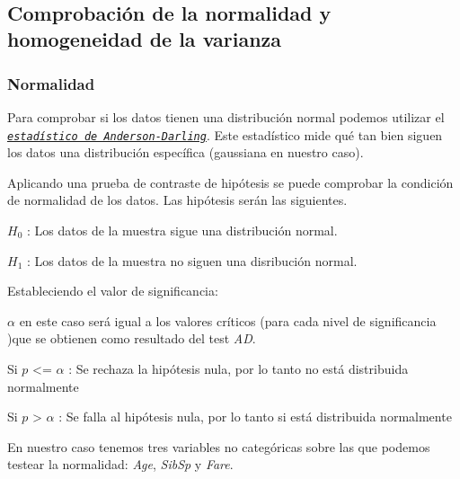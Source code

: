 \documentclass[11pt]{article}
\begin{document}
    \begin{center}
    \end{center}
    { \hspace*{\fill} \\}
    
    \hypertarget{comprobaciuxf3n-de-la-normalidad-y-homogeneidad-de-la-varianza}{%
\subsection{Comprobación de la normalidad y homogeneidad de la
varianza}\label{comprobaciuxf3n-de-la-normalidad-y-homogeneidad-de-la-varianza}}

    \hypertarget{normalidad}{%
\subsubsection{Normalidad}\label{normalidad}}

Para comprobar si los datos tienen una distribución normal podemos
utilizar el
\href{https://support.minitab.com/es-mx/minitab/18/help-and-how-to/statistics/basic-statistics/supporting-topics/normality/the-anderson-darling-statistic/}{\emph{\texttt{estadístico\ de\ Anderson-Darling}}}.
Este estadístico mide qué tan bien siguen los datos una distribución
específica (gaussiana en nuestro caso).

Aplicando una prueba de contraste de hipótesis se puede comprobar la
condición de normalidad de los datos. Las hipótesis serán las
siguientes.

\(H_0\) : Los datos de la muestra sigue una distribución normal.

\(H_1\) : Los datos de la muestra no siguen una disribución normal.

Estableciendo el valor de significancia:

\(\alpha\) en este caso será igual a los valores críticos (para cada
nivel de significancia )que se obtienen como resultado del test
\emph{AD}.

Si \(p\) \textless= \(\alpha\) : Se rechaza la hipótesis nula, por lo
tanto no está distribuida normalmente

Si \(p\) \textgreater{} \(\alpha\) : Se falla al hipótesis nula, por lo
tanto si está distribuida normalmente

En nuestro caso tenemos tres variables no categóricas sobre las que
podemos testear la normalidad: \emph{Age}, \emph{SibSp} y \emph{Fare}.
\end{document}
